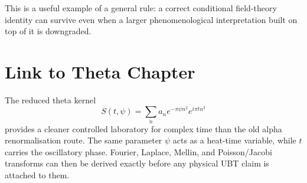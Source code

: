 This is a useful example of a general rule: a correct conditional field-theory
identity can survive even when a larger phenomenological interpretation built
on top of it is downgraded.

\section{Link to Theta Chapter}
The reduced theta kernel
\[
 S(t,\psi)=\sum_n a_n e^{-\pi\psi n^2}e^{i\pi t n^2}
\]
provides a cleaner controlled laboratory for complex time than the old alpha
renormalisation route.  The same parameter $\psi$ acts as a heat-time variable,
while $t$ carries the oscillatory phase.  Fourier, Laplace, Mellin, and
Poisson/Jacobi transforms can then be derived exactly before any physical UBT
claim is attached to them.
